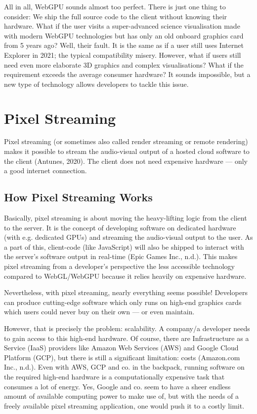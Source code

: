\documentclass[10pt]{article}
\begin{document}
\begin{sloppypar}
  All in all, WebGPU sounds almost too perfect. There is just one thing to consider: We ship the full source code to the client without knowing their hardware. What if the user visits a super-advanced science visualisation made with modern WebGPU technologies but has only an old onboard graphics card from 5 years ago? Well, their fault. It is the same as if a user still uses Internet Explorer in 2021; the typical compatibility misery. However, what if users still need even more elaborate 3D graphics and complex visualisations? What if the requirement exceeds the average consumer hardware? It sounds impossible, but a new type of technology allows developers to tackle this issue.

  \section{Pixel Streaming}
  \label{sec:pixel-streaming}

  Pixel streaming (or sometimes also called render streaming or remote rendering) makes it possible to stream the audio-visual output of a hosted cloud software to the client (Antunes, 2020). The client does not need expensive hardware — only a good internet connection.

  \subsection{How Pixel Streaming Works}
  \label{subsec:how-pixel-streaming-works}

  Basically, pixel streaming is about moving the heavy-lifting logic from the client to the server. It is the concept of developing software on dedicated hardware (with e.g. dedicated GPUs) and streaming the audio-visual output to the user. As a part of this, client-code (like JavaScript) will also be shipped to interact with the server’s software output in real-time (Epic Games Inc., n.d.). This makes pixel streaming from a developer’s perspective the less accessible technology compared to WebGL/WebGPU because it relies heavily on expensive hardware.

  Nevertheless, with pixel streaming, nearly everything seems possible! Developers can produce cutting-edge software which only runs on high-end graphics cards which users could never buy on their own — or even maintain.

  However, that is precisely the problem: scalability. A company/a developer needs to gain access to this high-end hardware. Of course, there are Infrastructure as a Service (IaaS) providers like Amazon Web Services (AWS) and Google Cloud Platform (GCP), but there is still a significant limitation: costs (Amazon.com Inc., n.d.). Even with AWS, GCP and co. in the backpack, running software on the required high-end hardware is a computationally expensive task that consumes a lot of energy. Yes, Google and co. seem to have a sheer endless amount of available computing power to make use of, but with the needs of a freely available pixel streaming application, one would push it to a costly limit.


\end{sloppypar}
\end{document}
